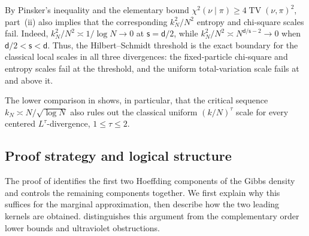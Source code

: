 \documentclass[11pt,reqno]{amsart}
\numberwithin{equation}{section}
\theoremstyle{plain}
\theoremstyle{remark}
\renewcommand{\d}{\mathsf{d}}
\newcommand{\s}{\mathsf{s}}
\newcommand{\Chi}{\chi^2}
\newcommand{\TV}{\operatorname{TV}}
\begin{document}
By Pinsker's inequality and the elementary bound \(\Chi(\nu\mid\pi)\ge4\TV(\nu,\pi)^2\), part~\textup{(ii)} also implies that the corresponding \(k_N^2/N^2\) entropy and chi-square scales fail.  Indeed, \(k_N^2/N^2\asymp1/\log N\to0\) at \(\s=\d/2\), while \(k_N^2/N^2\asymp N^{\d/\s-2}\to0\) when \(\d/2<\s<\d\).  Thus, the Hilbert--Schmidt threshold is the exact boundary for the classical local scales in all three divergences: the fixed-particle chi-square and entropy scales fail at the threshold, and the uniform total-variation scale fails at and above it.

The lower comparison in  shows, in particular, that the critical sequence \(k_N\asymp N/\sqrt{\log N}\) also rules out the classical uniform \((k/N)^\tau\) scale for every centered \(L^\tau\)-divergence, \(1\le\tau\le2\).

\subsection{Proof strategy and logical structure}
\label{subsec:global-proof-strategy}

The proof of  identifies the first two Hoeffding components of the Gibbs density and controls the remaining components together.  We first explain why this suffices for the marginal approximation, then describe how the two leading kernels are obtained.   distinguishes this argument from the complementary order lower bounds and ultraviolet obstructions.
\end{document}
